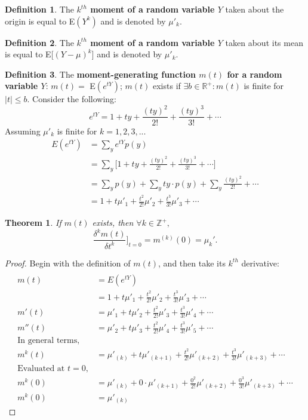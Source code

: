 \documentclass[a4paper]{article}
\newtheorem{thm}{Theorem}
\theoremstyle{definition}
\newtheorem{defn}{Definition}[section]
\begin{document}
\begin{defn} %
The \textbf{$k^{th}$ moment of a random variable $Y$} taken about the origin is equal to E$(Y^k)$ and is denoted by $\mu'_{k}.$
\end{defn}
\bigbreak
\begin{defn} %
The \textbf{$k^{th}$ moment of a random variable $Y$} taken about its mean is equal to E[$(Y-\mu)^k$] and is denoted by $\mu'_{k}.$
\end{defn}
\bigbreak
\begin{defn} %
The \textbf{moment-generating function $m(t)$ for a random variable $Y$}: $m(t)=$ E$(e^{tY})$; $m(t)$ exists if $\exists b \in \mathbb{R}^+: m(t)$ is finite for $|t| \le b.$
\bigbreak
Consider the following:
$$e^{tY} = 1+ty+\frac{(ty)^2}{2!}+\frac{(ty)^3}{3!}+ \cdots$$
\quad Assuming $\mu'_k$ is finite for $k = 1,2,3,...$
\begin{align*} 
E(e^{tY})&= \sum_y e^{tY}p(y) \\
{}&= \sum_y \bigg[1+ty+\frac{(ty)^2}{2!}+\frac{(ty)^3}{3!}+ \cdots\bigg] \\
{}&= \sum_y p(y) +\sum_y ty\cdot p(y) + \sum_y\frac{(ty)^2}{2!}+\cdots \\
{}&= 1+ t\mu'_1 + \frac{t^2}{2!}\mu'_2 + \frac{t^3}{3!}\mu'_3 + \cdots
\end{align*}
\end{defn} %
\bigbreak
\begin{thm} If $m(t)$ exists, then $\forall k \in \mathbb{Z}^+,$ 
$$\frac{\delta^k m(t)}{\delta t^k} \bigg]_{t=0} = m^{(k)}(0) = \mu_k'.$$
\end{thm}
\begin{proof} Begin with the definition of $m(t)$, and then take its $k^{th}$ derivative:
\begin{align*} 
\\m(t)&=E(e^{tY})
\\{}&=1+ t\mu'_1 + \frac{t^2}{2!}\mu'_2 + \frac{t^3}{3!}\mu'_3 + \cdots
\\m'(t)&=\mu'_1+ t\mu'_2 + \frac{t^2}{2!}\mu'_3 + \frac{t^3}{3!}\mu'_4+\cdots
\\m''(t)&=\mu'_2+ t\mu'_3 + \frac{t^2}{2!}\mu'_4 + \frac{t^3}{3!}\mu'_5+\cdots
\\\text{In general terms,}
\\m^{k}(t)&=\mu'_{(k)}+ t\mu'_{(k+1)} + \frac{t^2}{2!}\mu'_{(k+2)} + \frac{t^3}{3!}\mu'_{(k+3)}+\cdots
\\\text{Evaluated at }t=0,
\\m^{k}(0)&=\mu'_{(k)}+ 0\cdot \mu'_{(k+1)} + \frac{0^2}{2!}\mu'_{(k+2)} + \frac{0^3}{3!}\mu'_{(k+3)}+\cdots
\\m^{k}(0)&=\mu'_{(k)}
\end{align*}
\end{proof}
\end{document}
